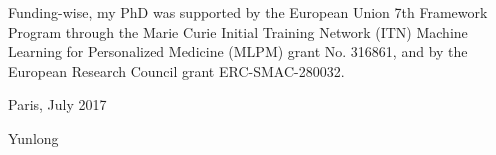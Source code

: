 Funding-wise, my PhD was supported by the European Union 7th Framework Program through the Marie Curie Initial Training Network (ITN) Machine Learning for Personalized Medicine (MLPM) grant No. 316861, and by the European Research Council grant ERC-SMAC-280032.


\begin{flushleft}
Paris, July 2017
\end{flushleft}

\begin{flushleft}
Yunlong
\end{flushleft}
